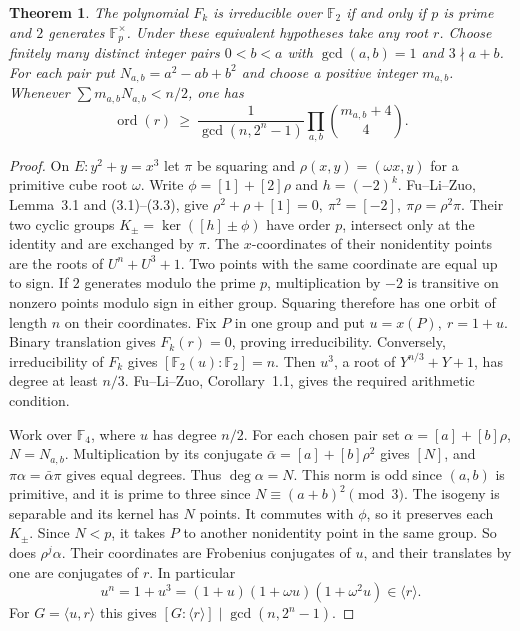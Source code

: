 \documentclass[11pt]{article}
\newtheorem{theorem}{Theorem}
\newcommand{\F}{\mathbb F_2}
\newcommand{\ord}{\operatorname{ord}}
\begin{document}
\begin{theorem}\label{thm:elliptic-pentanomial-order}
The polynomial \(F_k\) is irreducible over \(\F\) if and only if \(p\)
is prime and \(2\) generates \(\mathbb F_p^\times\).
Under these equivalent hypotheses take any root \(r\). Choose finitely
many distinct integer pairs \(0<b<a\) with \(\gcd(a,b)=1\) and
\(3\nmid a+b\). For each pair put \(N_{a,b}=a^2-ab+b^2\) and choose
a positive integer \(m_{a,b}\). Whenever
\(\sum m_{a,b}N_{a,b}<n/2\), one has
\[
   \ord(r)\ \ge\ \frac{1}{\gcd(n,2^n-1)}
                  \prod_{a,b}\binom{m_{a,b}+4}{4}.
\]
\end{theorem}
\begin{proof}
On \(E:y^2+y=x^3\) let \(\pi\) be squaring and
\(\rho(x,y)=(\omega x,y)\) for a primitive cube root \(\omega\).
Write \(\phi=[1]+[2]\rho\) and \(h=(-2)^k\).
Fu--Li--Zuo, Lemma~3.1 and (3.1)--(3.3), give
\(\rho^2+\rho+[1]=0,\ \pi^2=[-2],\ \pi\rho=\rho^2\pi\).
Their two cyclic groups \(K_\pm=\ker([h]\pm\phi)\) have order \(p\),
intersect only at the identity and are exchanged by \(\pi\).
The \(x\)-coordinates of their nonidentity points are the roots of
\(U^n+U^3+1\). Two points with the same coordinate are equal up to sign.
If \(2\) generates modulo the prime \(p\), multiplication by \(-2\)
is transitive on nonzero points modulo sign in either group. Squaring
therefore has one orbit of length \(n\) on their coordinates.
Fix \(P\) in one group and put \(u=x(P),\ r=1+u\). Binary translation
gives \(F_k(r)=0\), proving irreducibility. Conversely, irreducibility
of \(F_k\) gives \([\F(u):\F]=n\). Then \(u^3\), a root of
\(Y^{n/3}+Y+1\), has degree at least \(n/3\). Fu--Li--Zuo,
Corollary~1.1, gives the required arithmetic condition.

Work over \(\mathbb F_4\), where \(u\) has degree \(n/2\). For each
chosen pair set \(\alpha=[a]+[b]\rho\), \(N=N_{a,b}\). Multiplication
by its conjugate \(\bar\alpha=[a]+[b]\rho^2\) gives \([N]\), and
\(\pi\alpha=\bar\alpha\pi\) gives equal degrees. Thus
\(\deg\alpha=N\). This norm is odd since \((a,b)\) is primitive, and it is prime to three since \(N\equiv(a+b)^2\pmod3\).
The isogeny is separable and its kernel has \(N\) points.
It commutes with \(\phi\), so it preserves each \(K_\pm\). Since
\(N<p\), it takes \(P\) to another nonidentity point in the same group.
So does \(\rho^j\alpha\). Their coordinates are Frobenius conjugates of
\(u\), and their translates by one are conjugates of \(r\). In particular
\[
     u^n=1+u^3=(1+u)(1+\omega u)(1+\omega^2u)\in\langle r\rangle .
\]
For \(G=\langle u,r\rangle\) this gives
\([G:\langle r\rangle]\mid\gcd(n,2^n-1)\).


\end{proof}
\end{document}
